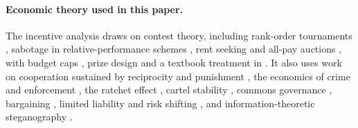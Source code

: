 \paragraph{Economic theory used in this paper.}
The incentive analysis draws on contest theory, including rank-order tournaments \citep{lazear1981rank}, sabotage in relative-performance schemes \citep{lazear1989pay}, rent seeking \citep{tullock1980efficient} and all-pay auctions \citep{hillman1989politically,baye1996allpay,barut1998symmetric}, with budget caps \citep{che1998caps}, prize design \citep{moldovanu2001optimal} and a textbook treatment in \citet{konrad2009strategy}.
It also uses work on cooperation sustained by reciprocity and punishment \citep{axelrod1984evolution,fehr2000cooperation}, the economics of crime and enforcement \citep{becker1968crime,stigler1970optimum}, the ratchet effect \citep{weitzman1980ratchet,freixas1985planning}, cartel stability \citep{stigler1964theory}, commons governance \citep{hardin1968tragedy,ostrom1990governing}, bargaining \citep{nash1950bargaining}, limited liability and risk shifting \citep{jensen1976theory}, and information-theoretic steganography \citep{simmons1984prisoners,cachin2004information}.
